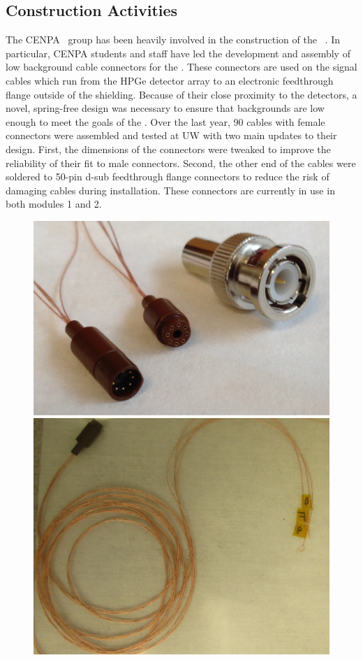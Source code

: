 \subsection{Construction Activities }



\noindent     %
The CENPA \MJ~group has been heavily involved in the construction of the \MJ~\MJDemo. In particular, CENPA students and staff have led the development and assembly of low background cable connectors for the \MJDemo. These connectors are used on the signal cables which run from the HPGe detector array to an electronic feedthrough flange outside of the shielding. Because of their close proximity to the detectors, a novel, spring-free design was necessary to ensure that backgrounds are low enough to meet the goals of the \MJDemo. Over the last year, 90 cables with female connectors were assembled and tested at UW with two main updates to their design. First, the dimensions of the connectors were tweaked to improve the reliability of their fit to male connectors. Second, the other end of the cables were soldered to 50-pin d-sub feedthrough flange connectors to reduce the risk of damaging cables during installation. These connectors are currently in use in both modules 1 and 2.

\begin{figure}[h]
  \hfil  \includegraphics[width=.5\textwidth]{SigConBNCComparison.jpg} \hfil 
  \hfil  \includegraphics[width=.415\textwidth]{signal_bundle.JPG} \hfil 
  
  
  
  \label{MJConnectors}  %
  
\end{figure}

